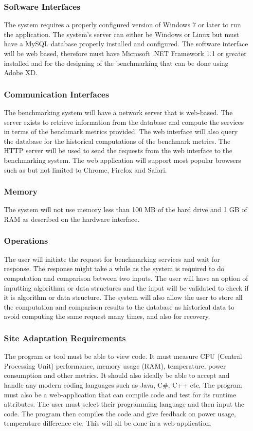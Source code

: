 \documentclass[a4paper,12pt]{article}
\begin{document}
\subsubsection{Software Interfaces}
The system requires a properly configured version of Windows 7 or later to run the application. The system's server can either be Windows or Linux but must have a MySQL database properly installed and configured. The software interface will be web based, therefore must have Microsoft .NET Framework 1.1 or greater installed and for the designing of the benchmarking that can be done using Adobe XD.

\subsubsection{Communication Interfaces}
The benchmarking system will have a network server that is web-based. The server exists to retrieve information from the database
and compute the services in terms of the benchmark metrics provided. The web interface will also query the database for the historical computations of the benchmark metrics. The HTTP server will be used to send the requests from the web interface to the benchmarking system. The web application will support most popular browsers such as but not limited to Chrome, Firefox and Safari.
\subsubsection{Memory}
The system will not use memory less than 100 MB of the hard drive and 1 GB of RAM as described on the hardware interface.
\subsubsection{Operations}
The user will initiate the request for benchmarking services and wait for response. The response might take a while as the system is required to do computation and comparison between two inputs. The user will have an option of inputting algorithms or data structures and the input will be validated to check if it is algorithm or data structure. The system will also allow the user to store all the computation and comparison results to the database as historical data to avoid computing the same request many times, and also for recovery. 
\subsubsection{Site Adaptation Requirements}
The program or tool must be able to view code. It must measure CPU (Central Processing Unit) performance, memory usage (RAM), temperature, power consumption and other metrics.
It should also ideally be able to accept and handle any modern coding languages such as Java, C\#, C++ etc. The program must also be a web-application that can compile code and test for its runtime attributes. 
The user must select their programming language and then input the code. The program then compiles the code and give feedback on power usage, temperature difference etc. This will all be done in a web-application.
\end{document}
